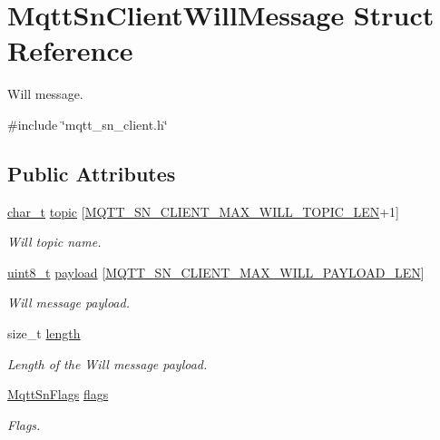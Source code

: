 \hypertarget{structMqttSnClientWillMessage}{}\section{Mqtt\+Sn\+Client\+Will\+Message Struct Reference}
\label{structMqttSnClientWillMessage}


Will message.  




{\ttfamily \#include \char`\"{}mqtt\+\_\+sn\+\_\+client.\+h\char`\"{}}

\subsection*{Public Attributes}
\begin{DoxyCompactItemize}
\item 
\hyperlink{compiler__port_8h_a40bb5262bf908c328fbcfbe5d29d0201}{char\+\_\+t} \hyperlink{structMqttSnClientWillMessage_a5dcdbc663ae144fe3779645c679fe099}{topic} \mbox{[}\hyperlink{mqtt__sn__client_8h_ae418ee87e6d47c1cfdb4e7a5694a2caa}{M\+Q\+T\+T\+\_\+\+S\+N\+\_\+\+C\+L\+I\+E\+N\+T\+\_\+\+M\+A\+X\+\_\+\+W\+I\+L\+L\+\_\+\+T\+O\+P\+I\+C\+\_\+\+L\+EN}+1\mbox{]}
\begin{DoxyCompactList}\small\item\em Will topic name. \end{DoxyCompactList}\item 
\hyperlink{stdint_8h_aba7bc1797add20fe3efdf37ced1182c5}{uint8\+\_\+t} \hyperlink{structMqttSnClientWillMessage_a1a447f7bcd61bae4307406c74021347b}{payload} \mbox{[}\hyperlink{mqtt__sn__client_8h_a1059cb0e47f7c47d79ca58c5f29c6126}{M\+Q\+T\+T\+\_\+\+S\+N\+\_\+\+C\+L\+I\+E\+N\+T\+\_\+\+M\+A\+X\+\_\+\+W\+I\+L\+L\+\_\+\+P\+A\+Y\+L\+O\+A\+D\+\_\+\+L\+EN}\mbox{]}
\begin{DoxyCompactList}\small\item\em Will message payload. \end{DoxyCompactList}\item 
size\+\_\+t \hyperlink{structMqttSnClientWillMessage_a288a300ac590bce986cb2c34d7fd4bc1}{length}
\begin{DoxyCompactList}\small\item\em Length of the Will message payload. \end{DoxyCompactList}\item 
\hyperlink{mqtt__sn__common_8h_adfa650f3c081a815eb81daa416bb94a0}{Mqtt\+Sn\+Flags} \hyperlink{structMqttSnClientWillMessage_ad7bf83d24d3d399263d04dff6b91e6d0}{flags}
\begin{DoxyCompactList}\small\item\em Flags. \end{DoxyCompactList}\end{DoxyCompactItemize}


